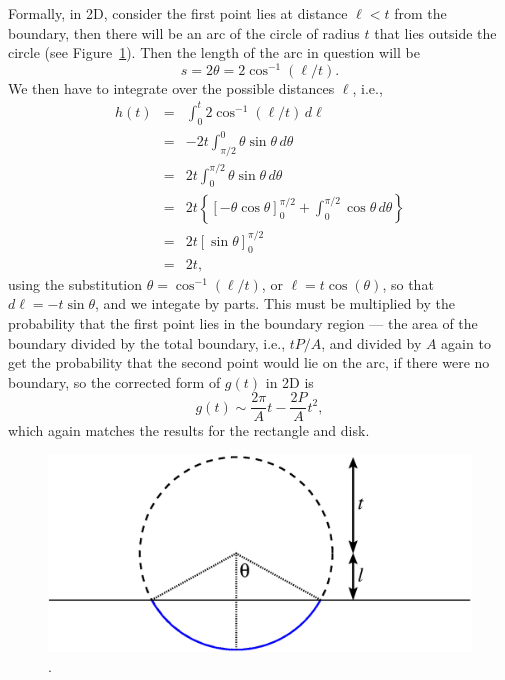 \documentclass{article}
\begin{document}
Formally, in 2D, consider the first point lies at distance $\ell<t$
from the boundary, then there will be an arc of the circle of radius
$t$ that lies outside the circle (see
Figure~\ref{fig:perimeter}). Then the length of the arc in question
will be
\begin{equation}
  \label{eq:arc_len}
  s = 2 \theta = 2 \cos^{-1} (\ell / t).
\end{equation}
We then have to integrate over the possible distances $\ell$, i.e., 
\begin{eqnarray}
  \label{eq:correction_2nd_order}
   h(t) & = & \int_0^t 2 \cos^{-1} (\ell / t)  \, d\ell \nonumber \\
        & = &  - 2 t \int_{\pi/2}^0 \theta  \sin \theta \, d\theta  \nonumber \\
        & = &  2 t \int^{\pi/2}_0 \theta  \sin \theta \, d\theta  \nonumber \\
        & = &  2 t \left\{ \left[ -\theta  \cos \theta \right]^{\pi/2}_0 + 
                      \int^{\pi/2}_0  \cos \theta \, d\theta
                   \right\}  \nonumber \\
        & = &  2 t \left[ \sin \theta \right]^{\pi/2}_0  \nonumber \\
        & = &  2 t,
\end{eqnarray}
using the substitution $\theta = \cos^{-1} (\ell / t)$, or $\ell = t
\cos(\theta)$, so that $d \ell = - t \sin \theta$, and we integate by
parts. This must be multiplied by the probability that the first point
lies in the boundary region --- the area of the boundary divided by the
total boundary, i.e., $t P/A$, and divided by $A$ again to get the
probability that the second point would lie on the arc, if there were
no boundary, so the corrected form of $g(t)$ in 2D is
\begin{equation}
  g(t) \sim  \frac{2 \pi}{A} t - \frac{2 P}{A} t^2,
\end{equation}
which again matches the results for the rectangle and disk.

\begin{figure}[tbp]
  \begin{center}
    \includegraphics[width=0.33\columnwidth]{Figs/perimeter.eps}
    \caption{.}
    \label{fig:perimeter}
  \end{center} 
\vspace{-4mm}
\end{figure}
\end{document}
